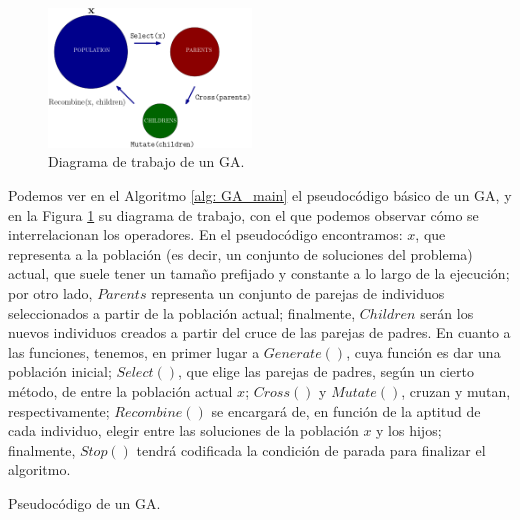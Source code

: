 \documentclass[12pt,a4paper]{book}
\begin{document}
\begin{figure}
  \begin{center}
    \includegraphics[width=0.48\textwidth]{img/flow_ga.png}
  \end{center}
  \caption{Diagrama de trabajo de un GA.}
  \label{fig:flow_ga}
\end{figure}

Podemos ver en el Algoritmo \ref{alg: GA_main} el pseudocódigo básico de un GA, y  en la Figura \ref{fig:flow_ga} su diagrama de trabajo, con el que podemos observar cómo se interrelacionan los operadores. En el pseudocódigo encontramos: $x$, que representa a la población (es decir, un conjunto de soluciones del problema) actual, que suele tener un tamaño prefijado y constante a lo largo de la ejecución; por otro lado, $Parents$ representa un conjunto de parejas de individuos seleccionados a partir de la población actual; finalmente, $Children$ serán los nuevos individuos creados a partir del cruce de las parejas de padres. En cuanto a las funciones, tenemos, en primer lugar a $Generate()$, cuya función es dar una población inicial; $Select()$, que elige las parejas de padres, según un cierto método, de entre la población actual $x$; $Cross()$ y $Mutate()$, cruzan y mutan, respectivamente; $Recombine()$ se encargará de, en función de la aptitud de cada individuo, elegir entre las soluciones de la población $x$ y los hijos; finalmente, $Stop()$ tendrá codificada la condición de parada para finalizar el algoritmo. 

\begin{algorithm}[h]
\DontPrintSemicolon
\SetAlgoLined
{}
\caption{Pseudocódigo de un GA.}
\label{alg: GA_main}
\end{algorithm}
\end{document}
